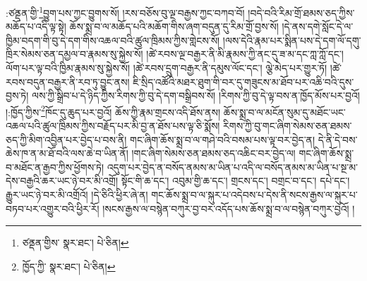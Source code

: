 :ཙནྡན་གྱི་\footnote{ཙནྡན་གྱིས་  སྣར་ཐང་།  པེ་ཅིན། }བྱུག་པས་ཀྱང་བྱུགས་སོ། །རས་བཅོས་བུ་ལྔ་བརྒྱས་ཀྱང་བཀབ་བོ། །བདེ་བའི་རིམ་གྲོ་ཐམས་ཅད་ཀྱིས་མཆོད་པ་འདི་ལྟ་སྟེ། ཆོས་སྨྲ་བ་ལ་མཆོད་པའི་མཆོག་གིས་ཞག་བདུན་དུ་རིམ་གྲོ་བྱས་སོ། །དེ་ནས་དགེ་སློང་དེ་ལ་ཁྱིམ་བདག་གི་བུ་དེ་དག་གིས་འཆལ་བའི་ཚུལ་ཁྲིམས་ཀྱིས་གླེངས་སོ། །ལས་དེའི་རྣམ་པར་སྨིན་པས་དེ་དག་ལོ་དགུ་ཁྲིར་སེམས་ཅན་དམྱལ་བ་རྣམས་སུ་སྐྱེས་སོ། །ཚེ་རབས་ལྔ་བརྒྱར་ནི་མི་རྣམས་ཀྱི་ནང་དུ་ཟ་མ་དང་ཀླ་ཀློ་དང་། ལོག་པར་ལྟ་བའི་ཁྱིམ་རྣམས་སུ་སྐྱེས་སོ། །ཚེ་རབས་དྲུག་བརྒྱར་ནི་དམུས་ལོང་དང་། ལྕེ་མེད་པར་གྱུར་ཏོ། །ཚེ་རབས་བདུན་བརྒྱར་ནི་རབ་ཏུ་བྱུང་ནས། ཇི་སྲིད་འཚོའི་མཐར་ཐུག་གི་བར་དུ་གཟུངས་མ་ཐོབ་པར་འཆི་བའི་དུས་བྱས་ཏེ། ལས་ཀྱི་སྒྲིབ་པ་དེ་ཉིད་ཀྱིས་རིགས་ཀྱི་བུ་དེ་དག་བསྒྲིབས་སོ། །རིགས་ཀྱི་བུ་དེ་ལྟ་བས་ན་ཁྱོད་མོས་པར་བྱའོ། །:ཁྱོད་ཀྱིས་\footnote{ཁྱོད་ཀྱི་  སྣར་ཐང་།  པེ་ཅིན། }ཁོང་དུ་ཆུད་པར་བྱའོ། ཆོས་ཀྱི་རྣམ་གྲངས་འདི་ཐོས་ནས། ཆོས་སྨྲ་བ་ལ་མངོན་སུམ་དུ་མཐོང་ཡང་འཆལ་པའི་ཚུལ་ཁྲིམས་ཀྱིས་བརྗོད་པར་མི་བྱ་ན་ཐོས་པས་ལྟ་ཅི་སྨོས། རིགས་ཀྱི་བུ་གང་ཞིག་སེམས་ཅན་ཐམས་ཅད་ཀྱི་མིག་འབྱིན་པར་བྱེད་པ་བས་ནི། གང་ཞིག་ཆོས་སྨྲ་བ་ལ་གཤེ་བའི་བསམ་པས་ལྟ་བར་བྱེད་ན། དེ་ནི་དེ་བས་ཆེས་ཁ་ན་མ་ཐོ་བའི་ལས་ཆེ་བ་ཡིན་ནོ། །གང་ཞིག་སེམས་ཅན་ཐམས་ཅད་འཆིང་བར་བྱེད་ལ། གང་ཞིག་ཆོས་སྨྲ་བ་མཐོང་ན་རྒྱབ་ཀྱིས་ཕྱོགས་ཏེ། འདུག་པར་བྱེད་ན་བསོད་ནམས་མ་ཡིན་པ་འདི་ལ་བསོད་ནམས་མ་ཡིན་པ་སྔ་མ་དེས་བརྒྱའི་ཆར་ཡང་ཉེ་བར་མི་འགྲོ། སྟོང་གི་ཆ་དང་། འབུམ་གྱི་ཆ་དང་། གྲངས་དང་། བགྲང་བ་དང་། དཔེ་དང་། རྒྱུར་ཡང་ཉེ་བར་མི་འགྲོའོ། །དེ་ཅིའི་ཕྱིར་ཞེ་ན། གང་ཆོས་སྨྲ་བ་ལ་སྐུར་པ་འདེབས་པ་དེས་ནི་སངས་རྒྱས་ལ་སྐུར་པ་བཏབ་པར་འགྱུར་བའི་ཕྱིར་རོ། །སངས་རྒྱས་ལ་བསྙེན་བཀུར་བྱ་བར་འདོད་པས་ཆོས་སྨྲ་བ་ལ་བསྙེན་བཀུར་བྱའོ། །
